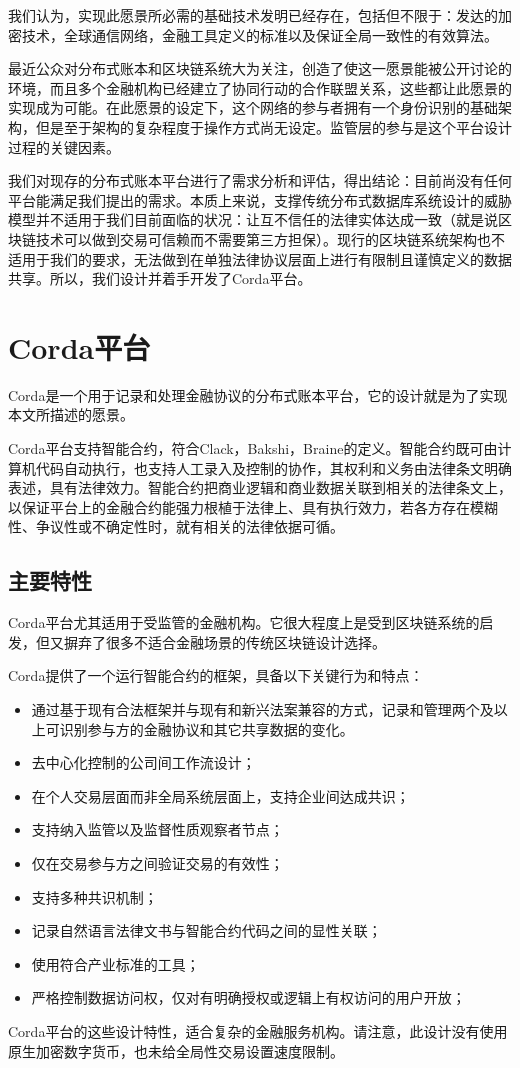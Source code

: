 \documentclass[UTF8]{ctexart}
\begin{document}
我们认为，实现此愿景所必需的基础技术发明已经存在，包括但不限于：发达的加密技术，全球通信网络，金融工具定义的标准以及保证全局一致性的有效算法。 

最近公众对分布式账本和区块链系统大为关注，创造了使这一愿景能被公开讨论的环境，而且多个金融机构已经建立了协同行动的合作联盟关系，这些都让此愿景的实现成为可能。在此愿景的设定下，这个网络的参与者拥有一个身份识别的基础架构，但是至于架构的复杂程度于操作方式尚无设定。监管层的参与是这个平台设计过程的关键因素。

我们对现存的分布式账本平台进行了需求分析和评估，得出结论：目前尚没有任何平台能满足我们提出的需求。本质上来说，支撑传统分布式数据库系统设计的威胁模型并不适用于我们目前面临的状况：让互不信任的法律实体达成一致（就是说区块链技术可以做到交易可信赖而不需要第三方担保）。现行的区块链系统架构也不适用于我们的要求，无法做到在单独法律协议层面上进行有限制且谨慎定义的数据共享。所以，我们设计并着手开发了Corda平台。

\section{Corda平台}
Corda是一个用于记录和处理金融协议的分布式账本平台，它的设计就是为了实现本文所描述的愿景。  

Corda平台支持智能合约，符合Clack，Bakshi，Braine的定义。\cite{SCT}智能合约既可由计算机代码自动执行，也支持人工录入及控制的协作，其权利和义务由法律条文明确表述，具有法律效力。智能合约把商业逻辑和商业数据关联到相关的法律条文上，以保证平台上的金融合约能强力根植于法律上、具有执行效力，若各方存在模糊性、争议性或不确定性时，就有相关的法律依据可循。

\subsection{主要特性}
Corda平台尤其适用于受监管的金融机构。它很大程度上是受到区块链系统的启发，但又摒弃了很多不适合金融场景的传统区块链设计选择。 

Corda提供了一个运行智能合约的框架，具备以下关键行为和特点：
\begin{itemize}
   \item  通过基于现有合法框架并与现有和新兴法案兼容的方式，记录和管理两个及以上可识别参与方的金融协议和其它共享数据的变化。
    \item 去中心化控制的公司间工作流设计；
    \item 在个人交易层面而非全局系统层面上，支持企业间达成共识；
    \item 支持纳入监管以及监督性质观察者节点；
    \item  仅在交易参与方之间验证交易的有效性；
    \item 支持多种共识机制；
    \item 记录自然语言法律文书与智能合约代码之间的显性关联；
    \item 使用符合产业标准的工具；
    \item 严格控制数据访问权，仅对有明确授权或逻辑上有权访问的用户开放；
\end{itemize}
Corda平台的这些设计特性，适合复杂的金融服务机构。请注意，此设计没有使用原生加密数字货币，也未给全局性交易设置速度限制。
\end{document}
